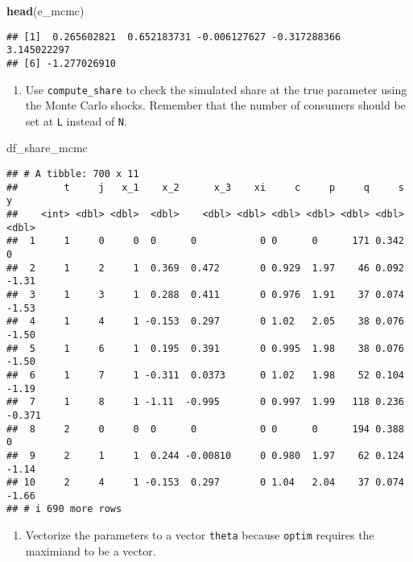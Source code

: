 \documentclass[
]{book}
\newenvironment{Shaded}{\begin{snugshade}}{\end{snugshade}}
\newcommand{\FunctionTok}[1]{\textcolor[rgb]{0.13,0.29,0.53}{\textbf{#1}}}
\newcommand{\NormalTok}[1]{#1}
\providecommand{\tightlist}{%
  \setlength{\itemsep}{0pt}\setlength{\parskip}{0pt}}
\begin{document}
\begin{Shaded}
\begin{Highlighting}[]
\FunctionTok{head}\NormalTok{(e\_mcmc)}
\end{Highlighting}
\end{Shaded}

\begin{verbatim}
## [1]  0.265602821  0.652183731 -0.006127627 -0.317288366  3.145022297
## [6] -1.277026910
\end{verbatim}

\begin{enumerate}
\def\labelenumi{\arabic{enumi}.}
\setcounter{enumi}{2}
\tightlist
\item
  Use \texttt{compute\_share} to check the simulated share at the true parameter using the Monte Carlo shocks. Remember that the number of consumers should be set at \texttt{L} instead of \texttt{N}.
\end{enumerate}

\begin{Shaded}
\begin{Highlighting}[]
\NormalTok{df\_share\_mcmc}
\end{Highlighting}
\end{Shaded}

\begin{verbatim}
## # A tibble: 700 x 11
##        t     j   x_1    x_2      x_3    xi     c     p     q     s      y
##    <int> <dbl> <dbl>  <dbl>    <dbl> <dbl> <dbl> <dbl> <dbl> <dbl>  <dbl>
##  1     1     0     0  0      0           0 0      0      171 0.342  0    
##  2     1     2     1  0.369  0.472       0 0.929  1.97    46 0.092 -1.31 
##  3     1     3     1  0.288  0.411       0 0.976  1.91    37 0.074 -1.53 
##  4     1     4     1 -0.153  0.297       0 1.02   2.05    38 0.076 -1.50 
##  5     1     6     1  0.195  0.391       0 0.995  1.98    38 0.076 -1.50 
##  6     1     7     1 -0.311  0.0373      0 1.02   1.98    52 0.104 -1.19 
##  7     1     8     1 -1.11  -0.995       0 0.997  1.99   118 0.236 -0.371
##  8     2     0     0  0      0           0 0      0      194 0.388  0    
##  9     2     1     1  0.244 -0.00810     0 0.980  1.97    62 0.124 -1.14 
## 10     2     4     1 -0.153  0.297       0 1.04   2.04    37 0.074 -1.66 
## # i 690 more rows
\end{verbatim}

\begin{enumerate}
\def\labelenumi{\arabic{enumi}.}
\setcounter{enumi}{4}
\tightlist
\item
  Vectorize the parameters to a vector \texttt{theta} because \texttt{optim} requires the maximiand to be a vector.
\end{enumerate}
\end{document}
